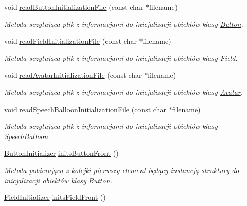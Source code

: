 \begin{DoxyCompactItemize}
\item 
void \mbox{\hyperlink{class_settings_container_a6b1f6f2c864c024f4ce39ae504840869}{read\+Button\+Initialization\+File}} (const char $\ast$filename)
\begin{DoxyCompactList}\small\item\em Metoda sczytująca plik z informacjami do inicjalizacji obiektów klasy \mbox{\hyperlink{class_button}{Button}}. \end{DoxyCompactList}\item 
void \mbox{\hyperlink{class_settings_container_a777b36e8fce724da732f4602cd54a7ab}{read\+Field\+Initialization\+File}} (const char $\ast$filename)
\begin{DoxyCompactList}\small\item\em Metoda sczytująca plik z informacjami do inicjalizacji obiektów klasy Field. \end{DoxyCompactList}\item 
void \mbox{\hyperlink{class_settings_container_aeb34f0b6cb059010e8dbd7349272c0a8}{read\+Avatar\+Initialization\+File}} (const char $\ast$filename)
\begin{DoxyCompactList}\small\item\em Metoda sczytująca plik z informacjami do inicjalizacji obiektów klasy \mbox{\hyperlink{class_avatar}{Avatar}}. \end{DoxyCompactList}\item 
void \mbox{\hyperlink{class_settings_container_a55e9d8fb7d663a5e625c3b7119a72611}{read\+Speech\+Balloon\+Initialization\+File}} (const char $\ast$filename)
\begin{DoxyCompactList}\small\item\em Metoda sczytująca plik z informacjami do inicjalizacji obiektów klasy \mbox{\hyperlink{class_speech_balloon}{Speech\+Balloon}}. \end{DoxyCompactList}\item 
\mbox{\hyperlink{struct_button_initializer}{Button\+Initializer}} \mbox{\hyperlink{class_settings_container_a0feef9027567bf372b846acc25d25db2}{inits\+Button\+Front}} ()
\begin{DoxyCompactList}\small\item\em Metoda pobierająca z kolejki pierwszy element będący instancją struktury do inicjalizacji obiektów klasy \mbox{\hyperlink{class_button}{Button}}. \end{DoxyCompactList}\item 
\mbox{\hyperlink{struct_field_initializer}{Field\+Initializer}} \mbox{\hyperlink{class_settings_container_ad0da265e5c15f125e07f3759a0585d07}{inits\+Field\+Front}} ()

\end{DoxyCompactItemize}
